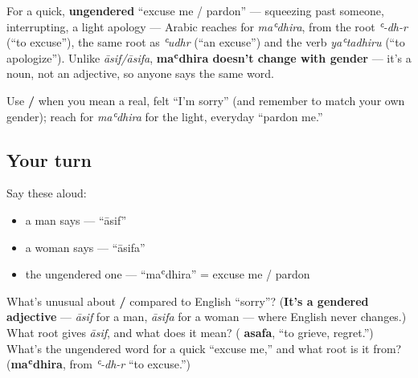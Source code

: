 \begin{culture}
For a quick, \textbf{ungendered} \textquotedblleft{}excuse me / pardon\textquotedblright{} — squeezing past someone, interrupting, a light apology — Arabic reaches for \emph{maʿdhira}, from the root \emph{ʿ-dh-r} (\textquotedblleft{}to excuse\textquotedblright{}), the same root as \emph{ʿudhr} (\textquotedblleft{}an excuse\textquotedblright{}) and the verb \emph{yaʿtadhiru} (\textquotedblleft{}to apologize\textquotedblright{}). Unlike \emph{āsif/āsifa}, \textbf{maʿdhira doesn't change with gender} — it's a noun, not an adjective, so anyone says the same word.

Use \textbf{/} when you mean a real, felt \textquotedblleft{}I'm sorry\textquotedblright{} (and remember to match your own gender); reach for \emph{maʿdhira} for the light, everyday \textquotedblleft{}pardon me.\textquotedblright{}
\end{culture}

\subsection*{Your turn}
Say these aloud:

\begin{itemize}
\raggedright
  \item a man says — \textquotedblleft{}āsif\textquotedblright{}
  \item a woman says — \textquotedblleft{}āsifa\textquotedblright{}
  \item the ungendered one — \textquotedblleft{}maʿdhira\textquotedblright{} = excuse me / pardon
\end{itemize}

\begin{tcolorbox}[breakable,colback=teal!4,colframe=teal!35!black,title={Before you move on}]
What's unusual about \textbf{ / } compared to English \textquotedblleft{}sorry\textquotedblright{}? (\textbf{It's a gendered adjective} — \emph{āsif} for a man, \emph{āsifa} for a woman — where English never changes.) What root gives \emph{āsif}, and what does it mean? (\textbf{ asafa}, \textquotedblleft{}to grieve, regret.\textquotedblright{}) What's the ungendered word for a quick \textquotedblleft{}excuse me,\textquotedblright{} and what root is it from? (\textbf{maʿdhira}, from \emph{ʿ-dh-r} \textquotedblleft{}to excuse.\textquotedblright{})
\end{tcolorbox}
